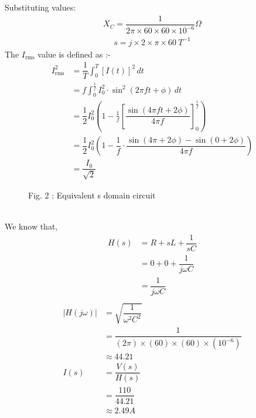\documentclass[journal,12pt,twocolumn]{IEEEtran}
\theoremstyle{remark}
\begin{document}
Substituting values: \\
\begin {align}
X_C = \dfrac{1}{2\pi \times 60 \times 60 \times 10^{-6}} \Omega
\end{align}
\begin {align}
s=j\times2\times\pi\times60 \: T^{-1}
\end{align}
The $I_{\text{rms}}$ value is defined as :-
\begin{align}
I_{\text{rms}}^2 &= {\dfrac{1}{T} \int_{0}^{T} [I(t)]^2 \, dt} \\
&= {f \int_{0}^{\frac{1}{f}} I_{\text{0}}^2 \cdot \sin^2(2\pi ft + \phi) \, dt} \\
&= \dfrac{1}{2} I_{0}^2 \left(1 - \frac{1}{f}\left[\dfrac{\sin(4\pi ft + 2\phi)}{4\pi f}\right]_{0}^{\frac{1}{f}}\right) \\
&= \dfrac{1}{2} I_{0}^2 \left(1 - \dfrac{1}{f} \cdot \dfrac{\sin\left(4\pi + 2\phi\right) - \sin(0 + 2\phi)}{4\pi f}\right) \\
&= \dfrac{I_{0}}{\sqrt{2}} 
\end{align}
\begin{figure}[htbp]
 \centering
    
    \caption*{Fig. 2 : Equivalent s domain circuit}
    \label{fig:enter-label}
\end{figure} \\
We know that,
\begin{align}
 H(s)&=R + sL + \dfrac{1}{sC}\\
&=0 + 0 +\dfrac{1}{j \omega C}\\
&=\dfrac{1}{j \omega C}\\
\end{align}
\begin{align}
 |H(j \omega)| &= \sqrt{ \dfrac{1}{\omega^2 C^2}}\\
 &= \dfrac{1}{{ (2\pi) \times(60)\times(60) \times (10^{-6})}}\\
&\approx 44.21\\
I(s) &= \dfrac{V(s)}{H(s)} \\
&=\dfrac{110}{44.21} \\
&\approx 2.49  A
\end{align}
\end{document}
